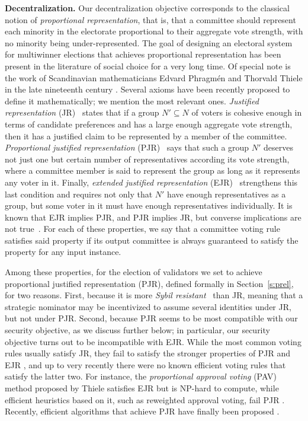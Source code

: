 \textbf{Decentralization.}
Our decentralization objective corresponds to the classical notion of \emph{proportional representation}, that is, that a committee should represent each minority in the electorate proportional to their aggregate vote strength, with no minority being under-represented. 
The goal of designing an electoral system for multiwinner elections that achieves proportional representation has been present in the literature of social choice for a very long time. Of special note is the work of Scandinavian mathematicians Edvard Phragm\'{e}n and Thorvald Thiele in the late nineteenth century \cite{phragmen1894methode, phragmen1895proportionella, phragmen1896theorie, phragmen1899till, thiele1895om, janson2016phragmen}. 
Several axioms have been recently proposed to define it mathematically; we mention the most relevant ones. 
\emph{Justified representation} (JR)~\cite{aziz2017justified} states that if a group $N'\subseteq N$ of voters is cohesive enough in terms of candidate preferences and has a large enough aggregate vote strength, then it has a justified claim to be represented by a member of the committee.
\emph{Proportional justified representation} (PJR)~\cite{sanchez2017proportional} says that such a group $N'$ deserves not just one but certain number of representatives according its vote strength, where a committee member is said to represent the group as long as it represents any voter in it.
Finally, \emph{extended justified representation} (EJR)~\cite{aziz2017justified} strengthens this last condition and requires not only that $N'$ have enough representatives as a group, but some voter in it must have enough representatives individually.
It is known that EJR implies PJR, and PJR implies JR, but converse implications are not true~\cite{sanchez2017proportional}. 
For each of these properties, we say that a committee voting rule satisfies said property if its output committee is always guaranteed to satisfy the property for any input instance. 

Among these properties, for the election of validators we set to achieve proportional justified representation (PJR), defined formally in Section~\ref{s:prel}, for two reasons. 
First, because it is more \emph{Sybil resistant}~\cite{douceur2002sybil} than JR, meaning that a strategic nominator may be incentivized to assume several identities under JR, but not under PJR. 
Second, because PJR seems to be most compatible with our security objective, as we discuss further below; in particular, our security objective turns out to be incompatible with EJR. 
While the most common voting rules usually satisfy JR, they fail to satisfy the stronger properties of PJR and EJR \cite{aziz2017justified, sanchez2017proportional}, 
and up to very recently there were no known efficient voting rules that satisfy the latter two. 
For instance, the \emph{proportional approval voting} (PAV) method \cite{thiele1895om, janson2016phragmen} proposed by Thiele satisfies EJR but is NP-hard to compute, while efficient heuristics based on it, such as reweighted approval voting, fail PJR \cite{aziz2014computational, skowron2016finding, aziz2017justified}. 
Recently, efficient algorithms that achieve PJR have finally been proposed \cite{brill2017phragmen, sanchez2016maximin}. 

